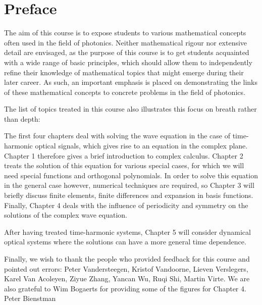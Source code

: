 \chapter*{Preface}
\label{h:Preface}

The aim of this course is to expose students to various mathematical concepts often used in the field of photonics. Neither mathematical rigour nor extensive detail are envisaged, as the purpose of this course is to get students acquainted with a wide range of basic principles, which should allow them to independently refine their knowledge of mathematical topics that might emerge during their later career. As such, an important emphasis is placed on demonstrating the links of these mathematical concepts to concrete problems in the field of photonics.

The list of topics treated in this course also illustrates this focus on breath rather than depth:

The first four chapters deal with solving the wave equation in the case of time-harmonic optical signals, which gives rise to an equation in the complex plane. Chapter 1 therefore gives a brief introduction to complex calculus. Chapter 2 treats the solution of this equation for various special cases, for which we will need special functions and orthogonal polynomials. In order to solve this equation in the general case however, numerical techniques are required, so Chapter 3 will briefly discuss finite elements, finite differences and expansion in basis functions. Finally, Chapter 4 deals with the influence of periodicity and symmetry on the solutions of the complex wave equation.

After having treated time-harmonic systems, Chapter 5 will consider dynamical optical systems where the solutions can have a more general time dependence.

Finally, we wish to thank the people who provided feedback for this course and pointed out errors: Peter Vandersteegen, Kristof Vandoorne, Lieven Verslegers, Karel Van Acoleyen, Ziyue Zhang, Yancan Wu, Ruqi Shi, Martin Virte. We are also grateful to Wim Bogaerts for providing some of the figures for Chapter 4.\\[1cm]

\hspace{10cm} Peter Bienstman
